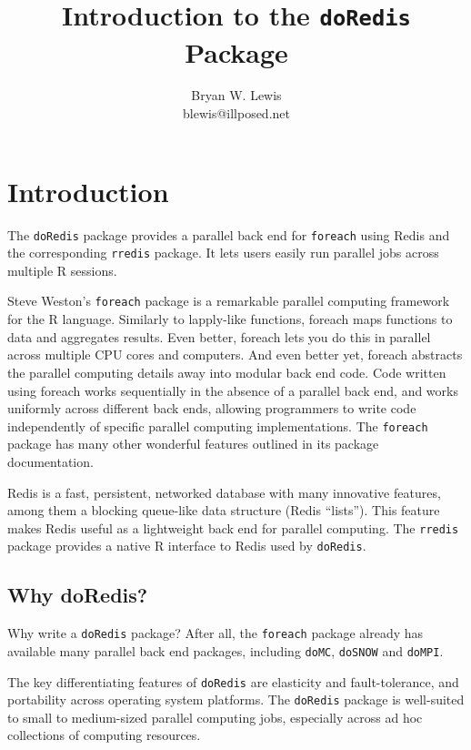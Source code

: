 \documentclass[12pt]{article}
\title{Introduction to the {\tt doRedis} Package}
\author{Bryan W. Lewis \\ 
blewis@illposed.net}
\begin{document}
\maketitle

\thispagestyle{empty}

\section{Introduction}

The {\tt doRedis} package provides a parallel back end for {\tt foreach} using
Redis and the corresponding {\tt rredis} package. It lets users easily run
parallel jobs across multiple R sessions.

Steve Weston's {\tt foreach} package is a remarkable parallel computing
framework for the R language. Similarly to lapply-like functions, foreach maps
functions to data and aggregates results. Even better, foreach lets you do this
in parallel across multiple CPU cores and computers.  And even better yet,
foreach abstracts the parallel computing details away into modular back end
code. Code written using foreach works sequentially in the absence of a
parallel back end, and works uniformly across different back ends, allowing
programmers to write code independently of specific parallel computing
implementations. The {\tt foreach} package has many other wonderful features
outlined in its package documentation.

Redis is a fast, persistent, networked database with many innovative features,
among them a blocking queue-like data structure (Redis ``lists''). This feature
makes Redis useful as a lightweight back end for parallel computing.  The
{\tt rredis} package provides a native R interface to Redis used by
{\tt doRedis}.

\subsection{Why doRedis?}

Why write a {\tt doRedis} package? After all, the {\tt foreach} package already
has available many parallel back end packages, including {\tt doMC}, 
{\tt doSNOW} and {\tt doMPI}.

The key differentiating features of {\tt doRedis} are elasticity and fault-tolerance,
and portability across operating system platforms. The {\tt doRedis} package is
well-suited to small to medium-sized parallel computing jobs, especially across
ad hoc collections of computing resources.
\end{document}
